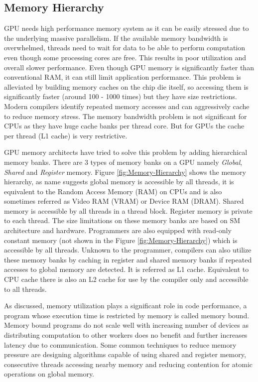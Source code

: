 \subsection{Memory Hierarchy}
GPU needs high performance memory system as it can be easily stressed due to the underlying massive parallelism.
If the available memory bandwidth is overwhelmed, threads need to wait for data to be able to perform computation even though some processing cores are free. This results in poor utilization and overall slower performance.
Even though GPU memory is significantly faster than conventional RAM, it can still limit application performance.
This problem is alleviated by building memory caches on the chip die itself, so accessing them is significantly faster (around 100 - 1000 times) but they have size restrictions.
Modern compilers identify repeated memory accesses and can aggressively cache to reduce memory stress.
The memory bandwidth problem is not significant for CPUs as they have huge cache banks per thread core. But for GPUs the cache per thread (L1 cache) is very restrictive.

GPU memory architects have tried to solve this problem by adding hierarchical memory banks. There are 3 types of memory banks on a GPU namely \textit{Global}, \textit{Shared} and \textit{Register} memory.
Figure \ref{fig:Memory-Hierarchy} shows the memory hierarchy, as name suggests global memory is accessible by all threads, it is equivalent to the Random Access Memory (RAM) on CPUs and is also sometimes referred as Video RAM (VRAM) or Device RAM (DRAM).
Shared memory is accessible by all threads in a thread block.
Register memory is private to each thread.
The size limitations on these memory banks are based on SM architecture and hardware.
Programmers are also equipped with read-only constant memory (not shown in the Figure \ref{fig:Memory-Hierarchy}) which is accessible by all threads.
Unknown to the programmer, compilers can also utilize these memory banks by caching in register and shared memory banks if repeated accesses to global memory are detected. It is referred as L1 cache. Equivalent to CPU cache there is also an L2 cache for use by the compiler only and accessible to all threads.

As discussed, memory utilization plays a significant role in code performance, a program whose execution time is restricted by memory is called memory bound. Memory bound programs do not scale well with increasing number of devices as distributing computation to other workers does no benefit and further increases latency due to communication.
Some common techniques to reduce memory pressure are designing algorithms capable of using shared and register memory, consecutive threads accessing nearby memory and reducing contention for atomic operations on global memory.



